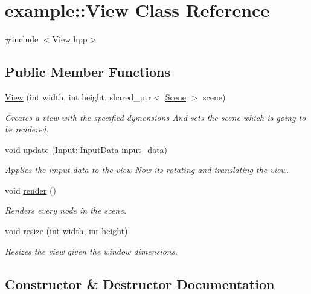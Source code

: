 \hypertarget{classexample_1_1_view}{}\section{example\+:\+:View Class Reference}
\label{classexample_1_1_view}


{\ttfamily \#include $<$View.\+hpp$>$}

\subsection*{Public Member Functions}
\begin{DoxyCompactItemize}
\item 
\mbox{\hyperlink{classexample_1_1_view_ae7f67b78cdd174449edc93960f29d9f4}{View}} (int width, int height, shared\+\_\+ptr$<$ \mbox{\hyperlink{classexample_1_1_scene}{Scene}} $>$ scene)
\begin{DoxyCompactList}\small\item\em Creates a view with the specified dymensions And sets the scene which is going to be rendered. \end{DoxyCompactList}\item 
void \mbox{\hyperlink{classexample_1_1_view_ac0b18fc4d2abe1abca6940c55313ef3b}{update}} (\mbox{\hyperlink{classexample_1_1_input_af6bf4fd763ca01bd106ca3b03f162e3d}{Input\+::\+Input\+Data}} input\+\_\+data)
\begin{DoxyCompactList}\small\item\em Applies the imput data to the view Now it\textquotesingle{}s rotating and translating the view. \end{DoxyCompactList}\item 
void \mbox{\hyperlink{classexample_1_1_view_a10ea89fc705a2ba2252f673499524bf2}{render}} ()
\begin{DoxyCompactList}\small\item\em Renders every node in the scene. \end{DoxyCompactList}\item 
void \mbox{\hyperlink{classexample_1_1_view_a2396337a1db393acefb174e386cde7d1}{resize}} (int width, int height)
\begin{DoxyCompactList}\small\item\em Resizes the view given the window dimensions. \end{DoxyCompactList}\end{DoxyCompactItemize}


\subsection{Constructor \& Destructor Documentation}
\mbox{\label{classexample_1_1_view_ae7f67b78cdd174449edc93960f29d9f4}} 
